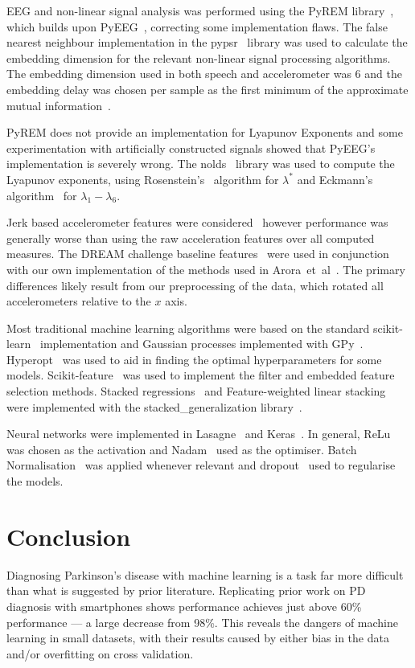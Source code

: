 \documentclass[12pt, twoside]{book}
\begin{document}
EEG and non-linear signal analysis was performed using the PyREM library~\cite{pyrem}, which builds upon PyEEG~\cite{pyeeg}, correcting some implementation flaws. The false nearest neighbour implementation in the pypsr~\cite{pypsr} library was used to calculate the embedding dimension for the relevant non-linear signal processing algorithms. The embedding dimension used in both speech and accelerometer was 6 and the embedding delay was chosen per sample as the first minimum of the approximate mutual information~\cite{rosenstein1993practicallyapunov}.
 
PyREM does not provide an implementation for Lyapunov Exponents and some experimentation with artificially constructed signals showed that PyEEG's implementation is severely wrong. The nolds~\cite{nolds} library was used to compute the Lyapunov exponents, using Rosenstein's~\cite{rosenstein1993practicallyapunov} algorithm for $\lambda^*$ and Eckmann's algorithm~\cite{eckmann1986liapunov} for $\lambda_1 - \lambda_6$.
  
Jerk based accelerometer features were considered~\cite{jerkfeature} however performance was generally worse than using the raw acceleration features over all computed measures. The DREAM challenge baseline features~\cite{mpowertools} were used in conjunction with our own implementation of the methods used in Arora~et~al~\cite{arora2014high}. The primary differences likely result from our preprocessing of the data, which rotated all accelerometers relative to the $x$ axis.


Most traditional machine learning algorithms were based on the standard scikit-learn~\cite{scikitlearn} implementation and Gaussian processes implemented with GPy~\cite{gpy2014}. Hyperopt~\cite{hyperopt} was used to aid in finding the optimal hyperparameters for some models. Scikit-feature~\cite{skfeature} was used to implement the filter and embedded feature selection methods. Stacked regressions~\cite{stackregression} and Feature-weighted linear stacking~\cite{fwls} were implemented with the stacked\_generalization library~\cite{stackedgeneralizaton}.

Neural networks were implemented in Lasagne~\cite{lasagne} and Keras~\cite{keras}. In general, ReLu~\cite{relu} was chosen as the activation and Nadam~\cite{nadam} used as the optimiser. Batch Normalisation~\cite{batchnorm} was applied whenever relevant and dropout~\cite{dropout} used to regularise the models. 




\chapter{Conclusion}
Diagnosing Parkinson's disease with machine learning is a task far more difficult than what is suggested by prior literature. Replicating prior work on PD diagnosis with smartphones shows performance achieves just above 60\% performance --- a large decrease from 98\%. This reveals the dangers of machine learning in small datasets, with their results caused by either bias in the data and/or overfitting on cross validation.
\end{document}
